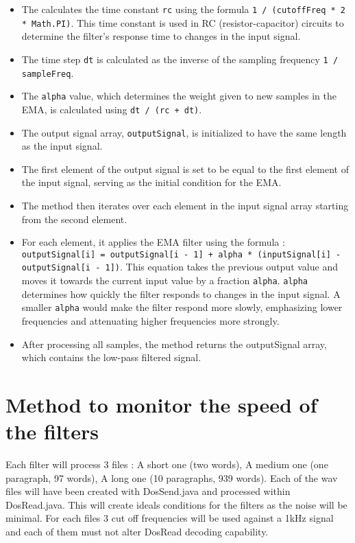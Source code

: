 \begin{itemize}
	\item The calculates the time constant \texttt{rc} using the formula \texttt{1 / (cutoffFreq * 2 * Math.PI)}. This time constant is used in RC (resistor-capacitor) circuits to determine the filter's response time to changes in the input signal.
	\item The time step \texttt{dt} is calculated as the inverse of the sampling frequency \texttt{1 / sampleFreq}.
	\item The \texttt{alpha} value, which determines the weight given to new samples in the EMA, is calculated using \texttt{dt / (rc + dt)}.
	\item The output signal array, \texttt{outputSignal}, is initialized to have the same length as the input signal.
	\item The first element of the output signal is set to be equal to the first element of the input signal, serving as the initial condition for the EMA.
	\item The method then iterates over each element in the input signal array starting from the second element.
	\item For each element, it applies the EMA filter using the formula : \texttt{outputSignal[i] = outputSignal[i - 1] + alpha * (inputSignal[i] - outputSignal[i - 1])}. This equation takes the previous output value and moves it towards the current input value by a fraction \texttt{alpha}. \texttt{alpha} determines how quickly the filter responds to changes in the input signal. A smaller \texttt{alpha} would make the filter respond more slowly, emphasizing lower frequencies and attenuating higher frequencies more strongly.
	\item After processing all samples, the method returns the outputSignal array, which contains the low-pass filtered signal.
\end{itemize}

\section{Method to monitor the speed of the filters}

Each filter will process 3 files : A short one (two words), A medium one (one paragraph, 97 words), A long one (10 paragraphs, 939 words). Each of the wav files will have been created with DosSend.java and processed within DosRead.java. This will create ideals conditions for the filters as the noise will be minimal. For each files 3 cut off frequencies will be used against a 1kHz signal and each of them must not alter DosRead decoding capability.